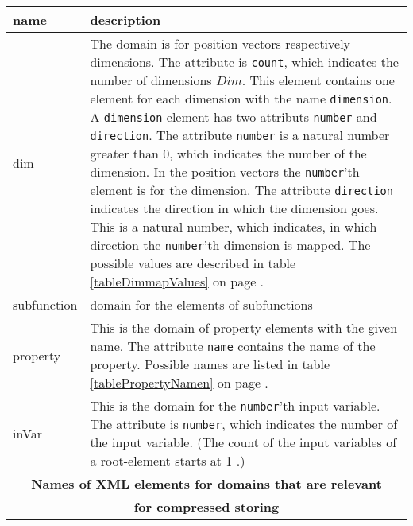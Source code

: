 \begin{center}
\begin{longtable}{|p{25mm}|p{100mm}|}\hline
	name & description \\\hline\endhead
	dim & The domain is for position vectors respectively dimensions. The attribute is \verb|count|, which indicates the number of dimensions $Dim$. This element contains one element for each dimension with the name \verb|dimension|. A \verb|dimension| element has two attributs \verb|number| and \verb|direction|. The attribute \verb|number| is a natural number greater than $0$, which indicates the number of the dimension. In the position vectors the \verb|number|'th element is for the dimension. The attribute \verb|direction| indicates the direction in which the dimension goes. This is a natural number, which indicates, in which direction the \verb|number|'th dimension is mapped. The possible values are described in table \ref{tableDimmapValues} on page \pageref{tableDimmapValues}. \\\hline
	subfunction & domain for the elements of subfunctions\\\hline
	property & This is the domain of property elements with the given name. The attribute \verb|name| contains the name of the property. Possible names are listed in table \ref{tablePropertyNamen} on page \pageref{tablePropertyNamen}.\\\hline
	inVar & This is the domain for the \verb|number|'th input variable. The attribute is \verb|number|, which indicates the number of the input variable. (The count of the input variables of a root-element starts at 1 .) \\\hline


	\multicolumn{2}{|c|}{\textbf{Names of XML elements for domains that are relevant}}\\
	\multicolumn{2}{|c|}{\textbf{for compressed storing}}\\\hline


\end{longtable}
\end{center}
